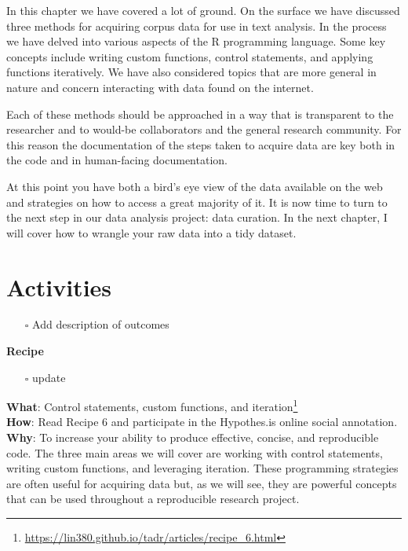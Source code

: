 \documentclass[
  letterpaper,
  DIV=11,
  numbers=noendperiod]{scrreport}
\providecommand{\tightlist}{%
  \setlength{\itemsep}{0pt}\setlength{\parskip}{0pt}}\usepackage{longtable,booktabs,array}
\theoremstyle{definition}
\theoremstyle{remark}
\DeclareRobustCommand{\href}[2]{#2\footnote{\url{#1}}}
\begin{document}

In this chapter we have covered a lot of ground. On the surface we have
discussed three methods for acquiring corpus data for use in text
analysis. In the process we have delved into various aspects of the R
programming language. Some key concepts include writing custom
functions, control statements, and applying functions iteratively. We
have also considered topics that are more general in nature and concern
interacting with data found on the internet.

Each of these methods should be approached in a way that is transparent
to the researcher and to would-be collaborators and the general research
community. For this reason the documentation of the steps taken to
acquire data are key both in the code and in human-facing documentation.

At this point you have both a bird's eye view of the data available on
the web and strategies on how to access a great majority of it. It is
now time to turn to the next step in our data analysis project: data
curation. In the next chapter, I will cover how to wrangle your raw data
into a tidy dataset.

\hypertarget{activities-3}{%
\section*{Activities}\label{activities-3}}


\begin{itemize}
\tightlist
\item[$\square$]
   Add description of outcomes
\end{itemize}

\begin{tcolorbox}[enhanced jigsaw, breakable, rightrule=.15mm, arc=.35mm, left=2mm, opacityback=0, leftrule=.75mm, toprule=.15mm, bottomrule=.15mm, colback=white]

\textbf{ Recipe}

\begin{itemize}
\tightlist
\item[$\square$]
   update
\end{itemize}

\textbf{What}:
\href{https://lin380.github.io/tadr/articles/recipe_6.html}{Control
statements, custom functions, and iteration}\\
\textbf{How}: Read Recipe 6 and participate in the Hypothes.is online
social annotation.\\
\textbf{Why}: To increase your ability to produce effective, concise,
and reproducible code. The three main areas we will cover are working
with control statements, writing custom functions, and leveraging
iteration. These programming strategies are often useful for acquiring
data but, as we will see, they are powerful concepts that can be used
throughout a reproducible research project.

\end{tcolorbox}
\end{document}
